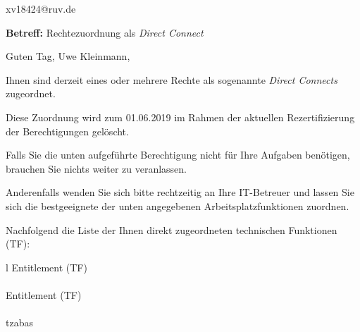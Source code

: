 \documentclass[a4paper,landscape,12pt]{letter}
\begin{document}
\begin{letter}{xv18424@ruv.de\hfill \break}
\begin{normalsize}
	\opening{\textbf{Betreff:} Rechtezuordnung als \emph{Direct Connect}}
	\begin{normalsize} \hfill
	\end{normalsize}

	\begin{normalsize}
		Guten Tag, 
	Uwe Kleinmann, \hfill \break
	\end{normalsize}
	\end{normalsize}
	
\begin{normalsize}
	Ihnen sind derzeit eines oder mehrere Rechte als sogenannte \emph{Direct Connects} zugeordnet.
	
	Diese Zuordnung wird zum 01.06.2019 im Rahmen der aktuellen Rezertifizierung der Berechtigungen gelöscht.
	
	Falls Sie die unten aufgeführte Berechtigung nicht für Ihre Aufgaben benötigen, 
	brauchen Sie nichts weiter zu veranlassen.
	
	Anderenfalls wenden Sie sich bitte rechtzeitig an Ihre IT-Betreuer 
	und lassen Sie sich die bestgeeignete der unten angegebenen Arbeitsplatzfunktionen zuordnen.
	\end{normalsize}
	
\begin{normalsize}
	Nachfolgend die Liste der Ihnen direkt zugeordneten technischen Funktionen (TF):

	\begin{longtable}{l}
		Entitlement (TF) \\ \hline
		\endfirsthead
		\\\hline
		Entitlement (TF) \\ \hline
		\endhead %
		\multicolumn{1}{r@{}}{Fortsetzung \ldots}\\
		\endfoot
		\hline
		\endlastfoot
	tzabas\\
	\end{longtable}
	\end{normalsize}
	

\end{letter}
\end{document}

